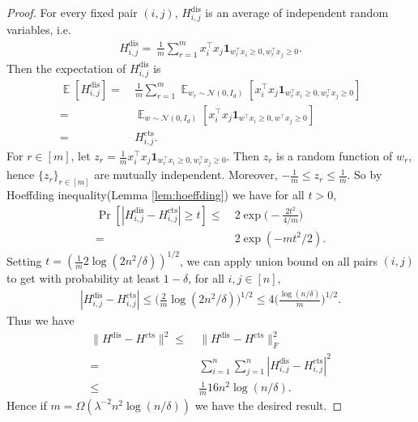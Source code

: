 \documentclass[11pt]{article}
\DeclareMathOperator*{\E}{\mathbb{E}}
\newcommand{\N}{\mathcal{N}}
\DeclareMathOperator{\dis}{dis}
\DeclareMathOperator{\cts}{cts}
\begin{document}
\begin{proof}%
For every fixed pair $(i,j)$,
$H_{i,j}^{\dis}$ is an average of independent random variables,
i.e.
\begin{align*}
H_{i,j}^{\dis}=~\frac {1}{m}\sum_{r=1}^m x_i^\top x_j\mathbf{1}_{w_r^\top x_i\geq 0,w_r^\top x_j\geq 0}.
\end{align*}
Then the expectation of $H_{i,j}^{\dis}$ is
\begin{align*}
\E [ H_{i,j}^{\dis} ]
= & ~\frac {1}{m}\sum_{r=1}^m \E_{w_r\sim {\N}(0,I_d)} \left[ x_i^\top x_j\mathbf{1}_{w_r^\top x_i\geq 0,w_r^\top x_j\geq 0} \right]\\
= & ~\E_{w\sim {\N}(0,I_d)} \left[ x_i^\top x_j\mathbf{1}_{w^\top x_i\geq 0,w^\top x_j\geq 0} \right]\\
= & ~ H_{i,j}^{\cts}.
\end{align*}
For $r\in [m]$,
let $z_r=\frac {1}{m}x_i^\top x_j \mathbf{1}_{w_r ^\top x_i\geq 0,w_r^\top x_j\geq 0}$.
Then $z_r$ is a random function of $w_r$,
hence $\{z_r\}_{r\in [m]}$ are mutually independent.
Moreover,
$-\frac {1}{m}\leq z_r\leq \frac {1}{m}$.
So by Hoeffding inequality(Lemma \ref{lem:hoeffding}) we have for all $t>0$,
\begin{align*}
\Pr \left[ | H_{i,j}^{\dis} - H_{i,j}^{\cts} | \geq t \right]
\leq & ~ 2\exp \Big( -\frac{2t^2}{4/m} \Big) \\
 = & ~ 2\exp(-mt^2/2).
\end{align*}
Setting $t=( \frac{1}{m} 2 \log (2n^2/\delta) )^{1/2}$,
we can apply union bound on all pairs $(i,j)$ to get with probability at least $1-\delta$,
for all $i,j\in [n]$,
\begin{align*}
|H_{i,j}^{\dis} - H_{i,j}^{\cts}|
\leq \Big( \frac{2}{m}\log (2n^2/\delta) \Big)^{1/2}
\leq 4 \Big( \frac{\log ( n/\delta ) }{m} \Big)^{1/2}.
\end{align*}
Thus we have
\begin{align*}
\|H^{\dis} - H^{\cts}\|^2 
\leq & ~ \|H^{\dis} - H^{\cts}\|_F^2 \\
 = & ~ \sum_{i=1}^n\sum_{j=1}^n |H_{i,j}^{\dis} - H_{i,j}^{\cts}|^2 \\
 \leq & ~ \frac{1}{m} 16n^2\log (n/\delta).
\end{align*}
Hence if $m=\Omega( \lambda^{-2} n^2\log (n/\delta) )$ we have the desired result.
\end{proof}

\end{document}
